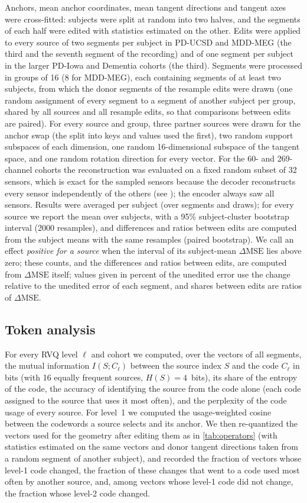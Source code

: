 \documentclass[10pt,letterpaper]{article}
\newcommand{\dmse}{\ensuremath{\Delta\mathrm{MSE}}}
\begin{document}
Anchors, mean anchor coordinates, mean tangent directions and tangent axes were cross-fitted:
subjects were split at random into two halves, and the segments of each half were edited with
statistics estimated on the other. Edits were applied to every source of two segments per
subject in PD-UCSD and MDD-MEG (the third and the seventh segment of the recording) and of one
segment per subject in the larger PD-Iowa and Dementia cohorts (the third). Segments were
processed in groups of 16 (8 for MDD-MEG), each containing segments of at least two subjects,
from which the donor segments of the resample edits were drawn (one random assignment of every
segment to a segment of another subject per group, shared by all sources and all resample edits,
so that comparisons between edits are paired). For every source and group,
three partner sources were drawn for the anchor swap (the split into keys and values used the
first), two random support subspaces of each dimension, one random 16-dimensional subspace of
the tangent space, and one random rotation direction for every vector. For the 60- and
269-channel cohorts the reconstruction was evaluated on a fixed random subset of 32 sensors,
which is exact for the sampled sensors because the decoder reconstructs every sensor
independently of the others (see ); the encoder always saw all sensors.
Results were averaged per subject (over segments and draws); for every source we report the
mean over subjects, with a 95\% subject-cluster bootstrap interval (2000 resamples), and
differences and ratios between edits are computed from the subject means with the same
resamples (paired bootstrap). We call an effect \emph{positive for a source} when the interval of
its subject-mean $\dmse$ lies above zero; these counts, and the differences and ratios between
edits, are computed from $\dmse$ itself; values given in percent of the unedited error use the change
relative to the unedited error of each segment, and shares between edits are ratios of $\dmse$.

\subsection*{Token analysis}\label{sec:methods-tokens}

For every RVQ level $\ell$ and cohort we computed, over the vectors of all segments, the
mutual information $I(S;C_\ell)$ between the source index $S$ and the code $C_\ell$ in bits
(with 16 equally frequent sources, $H(S)=4$~bits), its share of the entropy of the code, the
accuracy of identifying the source from the code alone (each code assigned to the source that
uses it most often), and the perplexity of the code usage of every source. For level~1 we
computed the usage-weighted cosine between the codewords a source selects and its anchor. We
then re-quantized the vectors used for the geometry after editing them as in
\cref{tab:operators} (with statistics estimated on the same vectors and donor tangent
directions taken from a random segment of another subject), and recorded the fraction of
vectors whose level-1 code changed, the fraction of these changes that went to a code used
most often by another source, and, among vectors whose level-1 code did not change, the
fraction whose level-2 code changed.
\end{document}
